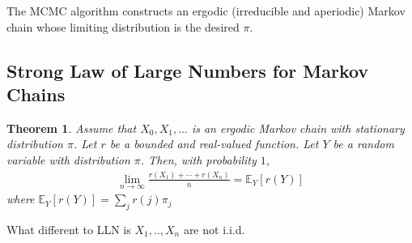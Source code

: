 \documentclass[11pt,a4paper]{article}
\newtheorem{theorem}{Theorem}
\begin{document}
The MCMC algorithm constructs an ergodic (irreducible and aperiodic) Markov chain whose limiting distribution is the desired $\pi$.

\subsection{Strong Law of Large Numbers for Markov Chains}
\begin{theorem}
    Assume that $X_0,X_1,...$ is an ergodic Markov chain  with stationary distribution $\pi$. Let $r$ be a bounded and real-valued function. Let $Y$ be a random variable with distribution $\pi$. Then, with probability $1$,
    \begin{equation}
        \begin{aligned}
            \lim_{n \rightarrow \infty}\frac{r(X_1)+\cdots+r(X_n)}{n}=\mathbb{E}_Y[r(Y)]
        \end{aligned}
        \nonumber
    \end{equation}
    where $\mathbb{E}_Y[r(Y)]=\sum_{j}r(j)\pi_j$
\end{theorem}
What different to LLN is $X_1,..,X_n$ are not i.i.d.
\end{document}
